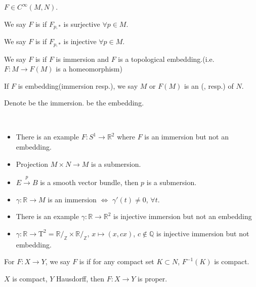 \begin{definition}
     $ F\in C^\infty(M,N) $. 
     
     We say  $ F $ is  if  $ F_{p,*} $ is surjective $ \forall p\in M $.
     
     We say  $ F $ is  if  $ F_{p,*} $ is injective $ \forall p\in M $.

     We say  $ F $ is  if  $ F $ is  immersion and  $ F $ is a topological embedding.(i.e.  $ F:M\rightarrow F(M) $ is a homeomorphism) 

     If  $ F $ is embedding(immersion resp.), we say  $ M $ or  $ F(M) $ is an (, resp.) of  $ N $.   
     
     Denote   be the immersion.  be the embedding.
\end{definition}
\begin{example}
    \,\begin{itemize}
        \item There is an example  $ F:S^1\rightarrow\mathbb{R}^2 $ where  $ F $ is an immersion but not an embedding.
        \item  Projection $ M\times N\rightarrow M $ is a submersion.
        \item  $ E\xrightarrow{p}B $ is a smooth vector bundle, then  $ p $ is a submersion.
        \item  $ \gamma:\mathbb{R}\rightarrow M $ is an immersion $ \Leftrightarrow $ $ \gamma'(t)\not=0 $,  $ \forall t $.
        \item There is an example  $ \gamma:\mathbb{R}\rightarrow \mathbb{R}^2 $ is injective immersion but not an embedding   
        \item  $ \gamma:\mathbb{R}\rightarrow \mathrm{T}^2=\mathbb{R}/_\mathbb{Z}\times   \mathbb{R}/_\mathbb{Z} $,  $ x\mapsto (x,cx) $,  $ c\not\in \mathbb{Q} $ is injective immersion but not embedding.         
    \end{itemize}
\end{example}
\begin{definition}
    For  $ F:X\rightarrow Y $, we say  $ F $ is  if for any compact set  $ K\subset N $,  $ F^{-1}(K) $ is compact.    
\end{definition}
\begin{lemma}
     $ X $ is compact,  $ Y $ Hausdorff, then  $ F:X\rightarrow Y $ is proper.  
\end{lemma}
